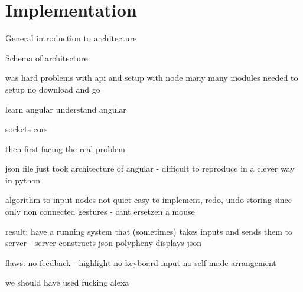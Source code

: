 \section{Implementation}
\label{g1:sec:implementation}  %

General introduction to architecture

Schema of architecture

was hard
problems with api
and setup with node
many many modules needed to setup no download and go

learn angular
understand angular

sockets
cors

then first facing the real problem

json file just took architecture of angular - difficult to reproduce in a clever way in python

algorithm to input nodes not quiet easy to implement, redo, undo storing since only non connected gestures - cant ersetzen a mouse

result:
have a running system that (sometimes) takes inputs and sends them to server - server constructs json
polypheny displays json

flaws:
no feedback - highlight
no keyboard input
no self made arrangement




we should have used fucking alexa